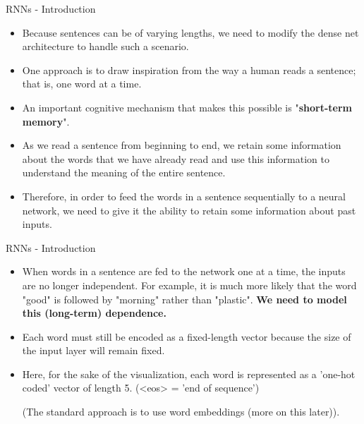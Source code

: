 \begin{frame} {RNNs - Introduction}
  \begin{itemize}
    \item Because sentences can be of varying lengths, we need to modify the dense net architecture to handle such a scenario.
    \item One approach is to draw inspiration from the way a human reads a sentence; that is, one word at a time.
    \item An important cognitive mechanism that makes this possible is "\textbf{short-term memory}".
    \item As we read a sentence from beginning to end, we retain some information about the words that we have already read and use this information to understand the meaning of the entire sentence.
    \item Therefore, in order to feed the words in a sentence sequentially to a neural network, we need to give it the ability to retain some information about past inputs.
  \end{itemize}
\end{frame}
 
\begin{frame} {RNNs - Introduction}
  \begin{itemize}
   \item %
    When words in a sentence are fed to the network one at a time, the inputs are no longer independent. For example, it is much more likely that the word "good" is followed by "morning" rather than "plastic". \textbf{We need to model this (long-term) dependence.} 
    \item %
    Each word must still be encoded as a fixed-length vector because the size of the input layer will remain fixed.
    \item Here, for the sake of the visualization, each word is represented as a 'one-hot coded' vector of length 5. (<eos> = 'end of sequence')
    \begin{figure}
      \centering
  \end{figure}
    (The standard approach is to use word embeddings (more on this later)).
  \end{itemize}
\end{frame}

